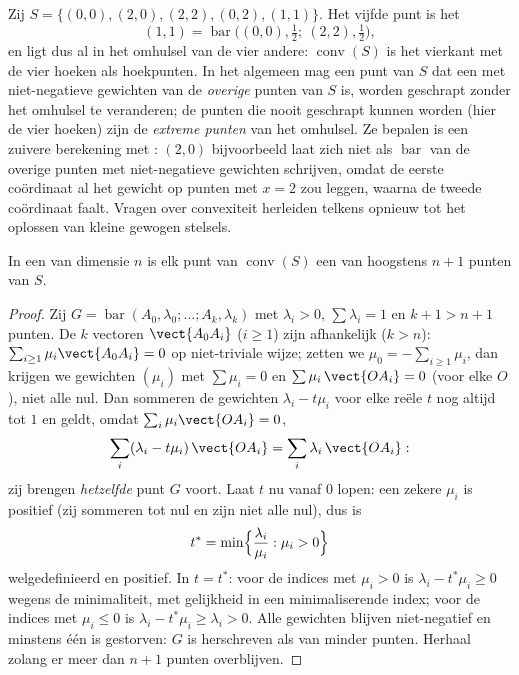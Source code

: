 \begin{example}\label{ex:b2:affine:squarehull}
Zij $S = \{(0,0), (2,0), (2,2), (0,2), (1,1)\}$. Het vijfde punt is
het 
\[
(1,1) = \operatorname{bar}\bigl((0,0), \tfrac12;\ (2,2),
\tfrac12\bigr),
\]
en ligt dus al in het omhulsel van de vier andere:
$\operatorname{conv}(S)$ is het vierkant met de vier hoeken als
hoekpunten. In het algemeen mag een punt van $S$ dat een
 met niet-negatieve gewichten van de \emph{overige}
punten van $S$ is, worden geschrapt zonder het omhulsel te
veranderen; de punten die nooit geschrapt kunnen worden (hier de
vier hoeken) zijn de \emph{extreme punten} van het omhulsel. Ze
bepalen is een zuivere berekening met : $(2,0)$
bijvoorbeeld laat zich niet als $\operatorname{bar}$ van de overige
punten met niet-negatieve gewichten schrijven, omdat de eerste
coördinaat al het gewicht op punten met $x = 2$ zou leggen,
waarna de tweede coördinaat faalt. Vragen over convexiteit
herleiden telkens opnieuw tot het oplossen van kleine gewogen
stelsels.
\end{example}

\begin{theorem}[Carathéodory]\label{thm:b2:affine:caratheodory}
In een  van dimensie $n$ is elk punt van
$\operatorname{conv}(S)$ een  van hoogstens $n + 1$
punten van $S$.
\end{theorem}

\begin{proof}
Zij $G = \operatorname{bar}(A_0, \lambda_0; \dots; A_k,
\lambda_k)$ met $\lambda_i > 0$, $\sum\lambda_i = 1$ en $k + 1 > n
+ 1$ punten. De $k$ vectoren $\vect{A_0A_i}$ ($i \geq 1$) zijn
afhankelijk ($k > n$): $\sum_{i\geq1}\mu_i \vect{A_0A_i} = 0$ op
niet-triviale wijze; zetten we $\mu_0 = -\sum_{i\geq1}\mu_i$, dan
krijgen we gewichten $(\mu_i)$ met $\sum\mu_i = 0$ en $\sum
\mu_i\,\vect{OA_i} = 0$ (voor elke $O$), niet alle nul. Dan
sommeren de gewichten $\lambda_i - t\mu_i$ voor elke reële $t$ nog
altijd tot $1$ en geldt, omdat $\sum_i\mu_i\vect{OA_i} = 0$,
\[
\sum_i(\lambda_i - t\mu_i)\,\vect{OA_i}
= \sum_i\lambda_i\,\vect{OA_i} :
\]
zij brengen \emph{hetzelfde} punt $G$ voort. Laat $t$ nu vanaf $0$
lopen: een zekere $\mu_i$ is positief (zij sommeren tot nul en zijn
niet alle nul), dus is
\[
t^* = \min\Bigl\{\frac{\lambda_i}{\mu_i} : \mu_i > 0\Bigr\}
\]
welgedefinieerd en positief. In $t = t^*$: voor de indices met
$\mu_i > 0$ is $\lambda_i - t^*\mu_i \geq 0$ wegens de
minimaliteit, met gelijkheid in een minimaliserende index; voor de
indices met $\mu_i \leq 0$ is $\lambda_i - t^*\mu_i \geq \lambda_i
> 0$. Alle gewichten blijven niet-negatief en minstens één is
gestorven: $G$ is herschreven als  van minder punten.
Herhaal zolang er meer dan $n + 1$ punten overblijven.
\end{proof}

